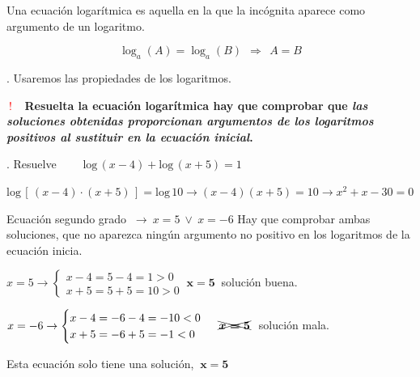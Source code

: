 \begin{definition}

Una ecuación logarítmica es aquella en la que la incógnita aparece como argumento de un logaritmo.

$$\log_a(A)=\log_a(B) \ \ \Rightarrow \ \ A=B$$
\end{definition}

\begin{theorem}
. Usaremos las propiedades de los logaritmos.	

\vspace{5mm} 
\begin{destacado}
\begin{small}
 \textcolor{red}{$\boldsymbol{\boxed{ \ ! \ }} $}  $\ $ \textbf{Resuelta la ecuación logarítmica hay que comprobar que \emph{las soluciones obtenidas proporcionan argumentos de los logaritmos \textbf{positivos} al sustituir en la ecuación inicial}.}
 \end{small}
 \end{destacado}
\end{theorem}


\begin{miejemplo}
	. Resuelve $\qquad \mathrm{log}\, (x-4)+\mathrm{log}\, (x+5)=1$
	
\vspace{5mm} $\mathrm{log}\, [\, (x-4)\cdot (x+5) \, ]=\mathrm{log}\, 10 \to (x-4)(x+5)=10 \to x^2+x-30=0$

\vspace{2mm} Ecuación segundo grado $\ \to \ x=5 \ \vee \ x=-6$ Hay que comprobar ambas soluciones, que no aparezca ningún argumento no positivo en los logaritmos de la ecuación inicia.

\vspace{2mm} $x=5 \to \begin{cases} x-4=5-4=1>0 \\ x+5=5+5=10>0 \end{cases} \ \boldsymbol{ x=5}\ $ solución buena.

\vspace{2mm} $x=-6 \to \begin{cases} x-4=-6-4=-10<0 \\ x+5=-6+5=-1<0 \end{cases} \ \cancel{\bcancel{\boldsymbol{x=5}}}\ $ solución mala.

\vspace{2mm} Esta ecuación solo tiene una solución, $\ \boldsymbol{x=5}$
\end{miejemplo}

